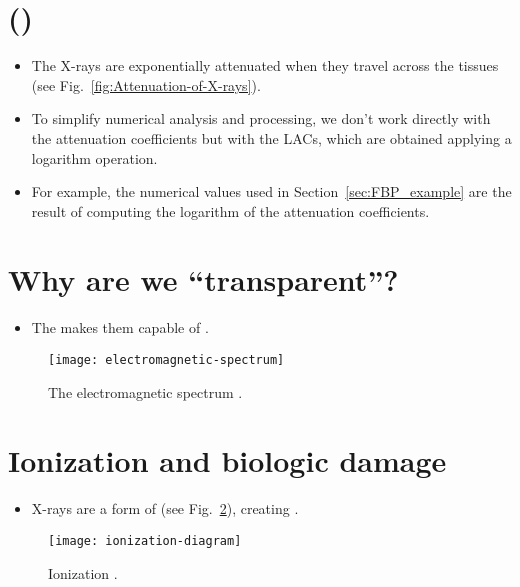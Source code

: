 \section{ ()}
\begin{itemize}
\item The X-rays are
  exponentially attenuated when they travel across the tissues \cite{wikipedia_LAC} (see
  Fig.~\ref{fig:Attenuation-of-X-rays}).
\item To simplify numerical analysis and processing, we don't work
  directly with the attenuation coefficients but with the \glspl{LAC}, which
  are obtained applying a logarithm operation.
\item For example, the numerical values used in
  Section~\ref{sec:FBP_example} are the result of computing the
  logarithm of the 
  attenuation coefficients.
\end{itemize}

\section{Why are we ``transparent''?}
\begin{itemize}
\item The  makes them capable of .
\end{itemize}
\vspace{-1ex}
\begin{figure}[!h]
  \centering
  \texttt{[image: electromagnetic-spectrum]}
  \caption{The electromagnetic spectrum
    \cite{X-rays_in_spectrum}.\label{fig:X-rays_in_spectrum}}
\end{figure}

\section{Ionization and biologic damage}
\begin{itemize}
\item X-rays are a form of  (see Fig.~\ref{fig:ionization}), creating
  .
\end{itemize}
\vspace{-1ex}
\begin{figure}[!h]
  \centering
  \texttt{[image: ionization-diagram]}
  \caption{Ionization
    \cite{Perakende_ionization}.\label{fig:ionization}}
\end{figure}

